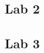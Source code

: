\documentclass{article}
\begin{document}
\begin{center}
    \section*{Lab 2}
\end{center}


\begin{center}
    \section*{Lab 3}
    \end{center}
\end{document}
